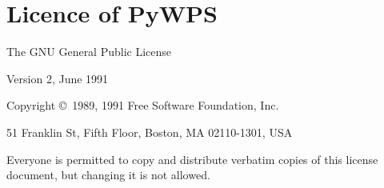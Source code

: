 \documentclass[a4paper,11pt]{article}
\begin{document}
\clearpage

    \section{Licence of PyWPS}

\begin{center}
{\Large The GNU General Public License}

{\parindent 0in

Version 2, June 1991

Copyright \copyright\ 1989, 1991 Free Software Foundation, Inc.

\bigskip

51 Franklin St, Fifth Floor, Boston, MA  02110-1301, USA

\bigskip

Everyone is permitted to copy and distribute verbatim copies
of this license document, but changing it is not allowed.
}
\end{center}
\end{document}
